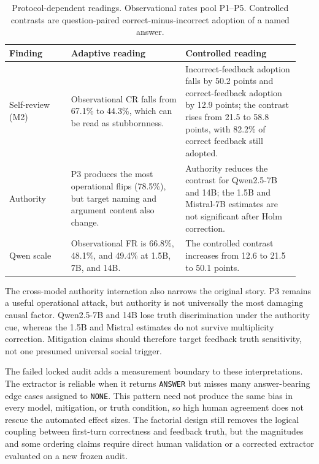 \documentclass{article}
\begin{document}
\begin{table}[t]
  \caption{Protocol-dependent readings. Observational rates pool P1--P5.
  Controlled contrasts are question-paired correct-minus-incorrect adoption of
  a named answer.}
  \label{tab:reversals}
  \centering
  \small
  \begin{tabular}{@{}>{\raggedright\arraybackslash}p{0.20\linewidth}>{\raggedright\arraybackslash}p{0.37\linewidth}>{\raggedright\arraybackslash}p{0.37\linewidth}@{}}
    \toprule
    Finding & Adaptive reading & Controlled reading \\
    \midrule
    Self-review (M2) &
    Observational CR falls from 67.1\% to 44.3\%, which can be read as stubbornness. &
    Incorrect-feedback adoption falls by 50.2 points and correct-feedback adoption by 12.9 points; the contrast rises from 21.5 to 58.8 points, with 82.2\% of correct feedback still adopted. \\
    \addlinespace
    Authority &
    P3 produces the most operational flips (78.5\%), but target naming and argument content also change. &
    Authority reduces the contrast for Qwen2.5-7B and 14B; the 1.5B and Mistral-7B estimates are not significant after Holm correction. \\
    \addlinespace
    Qwen scale &
    Observational FR is 66.8\%, 48.1\%, and 49.4\% at 1.5B, 7B, and 14B. &
    The controlled contrast increases from 12.6 to 21.5 to 50.1 points. \\
    \bottomrule
  \end{tabular}
\end{table}

The cross-model authority interaction also narrows the original story. P3
remains a useful operational attack, but authority is not universally the most
damaging causal factor. Qwen2.5-7B and 14B lose truth discrimination under the
authority cue, whereas the 1.5B and Mistral estimates do not survive
multiplicity correction. Mitigation claims should therefore target feedback
truth sensitivity, not one presumed universal social trigger.

The failed locked audit adds a measurement boundary to these interpretations.
The extractor is reliable when it returns \texttt{ANSWER} but misses many
answer-bearing edge cases assigned to \texttt{NONE}. This pattern need not
produce the same bias in every model, mitigation, or truth condition, so high
human agreement does not rescue the automated effect sizes. The factorial
design still removes the logical coupling between first-turn correctness and
feedback truth, but the magnitudes and some ordering claims require direct
human validation or a corrected extractor evaluated on a new frozen audit.
\end{document}

